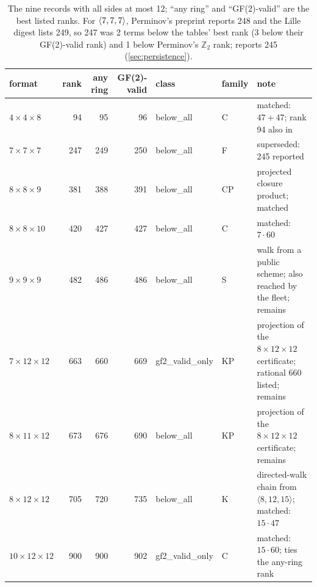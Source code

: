 \begin{table}[t]
\centering\small
\begin{tabular}{@{}lrrrp{2.7cm}l>{\raggedright\arraybackslash}p{3.5cm}@{}}
\toprule
format & rank & any ring & GF(2)-valid & class & family & note\\
\midrule
$4\times4\times8$ & 94 & 95 & 96 & \textsf{below\_all} & C & matched: $47+47$; rank 94 also in \cite{perminov2025ternary}\\
$7\times7\times7$ & 247 & 249 & 250 & \textsf{below\_all} & F & superseded: 245 reported \cite{medley2026gpu}\\
$8\times8\times9$ & 381 & 388 & 391 & \textsf{below\_all} & CP & projected closure product; matched\\
$8\times8\times10$ & 420 & 427 & 427 & \textsf{below\_all} & C & matched: $7\cdot60$\\
$9\times9\times9$ & 482 & 486 & 486 & \textsf{below\_all} & S & walk from a public scheme; also reached by the fleet; remains\\
$7\times12\times12$ & 663 & 660 & 669 & \textsf{gf2\_valid\_only} & KP & projection of the $8\times12\times12$ certificate; rational 660 listed; remains\\
$8\times11\times12$ & 673 & 676 & 690 & \textsf{below\_all} & KP & projection of the $8\times12\times12$ certificate; remains\\
$8\times12\times12$ & 705 & 720 & 735 & \textsf{below\_all} & K & directed-walk chain from $\langle8,12,15\rangle$; matched: $15\cdot47$\\
$10\times12\times12$ & 900 & 900 & 902 & \textsf{gf2\_valid\_only} & C & matched: $15\cdot60$; ties the any-ring rank\\
\bottomrule
\end{tabular}
\caption{The nine records with all sides at most 12; ``any ring'' and ``GF(2)-valid'' are the best listed ranks. For $\langle 7,7,7\rangle$, Perminov's preprint \cite{perminov2025ternary} reports 248 and the Lille digest lists 249, so 247 was 2 terms below the tables' best rank (3 below their GF(2)-valid rank) and 1 below Perminov's $\mathbb Z_2$ rank; \cite{medley2026gpu} reports 245 (\cref{sec:persistence}).}
\label{tab:small}
\end{table}

